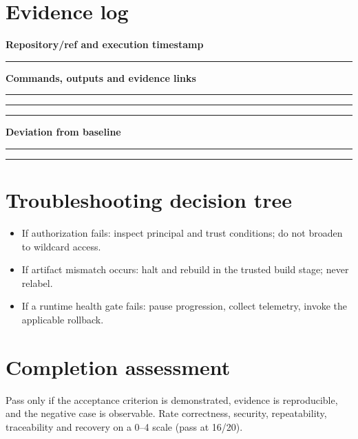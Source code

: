 \documentclass[10pt,letterpaper]{article}
\begin{document}
\section{Evidence log}
\textbf{Repository/ref and execution timestamp}\par
\noindent\rule{\linewidth}{0.35pt}\par\vspace{0.7em}
\textbf{Commands, outputs and evidence links}\par
\noindent\rule{\linewidth}{0.35pt}\par\vspace{0.7em}
\noindent\rule{\linewidth}{0.35pt}\par\vspace{0.7em}
\noindent\rule{\linewidth}{0.35pt}\par\vspace{0.7em}
\textbf{Deviation from baseline}\par
\noindent\rule{\linewidth}{0.35pt}\par\vspace{0.7em}
\noindent\rule{\linewidth}{0.35pt}\par\vspace{0.7em}

\section{Troubleshooting decision tree}
\begin{itemize}
\item If authorization fails: inspect principal and trust conditions; do not broaden to wildcard access.
\item If artifact mismatch occurs: halt and rebuild in the trusted build stage; never relabel.
\item If a runtime health gate fails: pause progression, collect telemetry, invoke the applicable rollback.
\end{itemize}

\section{Completion assessment}
Pass only if the acceptance criterion is demonstrated, evidence is reproducible, and the negative case is observable. Rate correctness, security, repeatability, traceability and recovery on a 0--4 scale (pass at 16/20).
\end{document}

